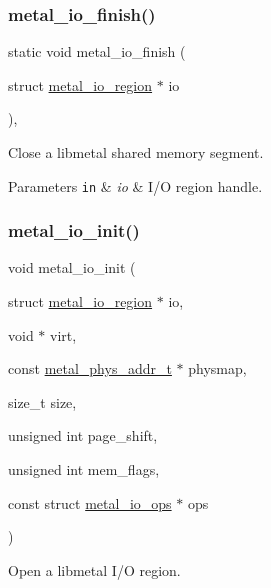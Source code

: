 \subsubsection{\texorpdfstring{metal\+\_\+io\+\_\+finish()}{metal\_io\_finish()}}
{\footnotesize\ttfamily static void metal\+\_\+io\+\_\+finish (\begin{DoxyParamCaption}\item[{struct \hyperlink{structmetal__io__region}{metal\+\_\+io\+\_\+region} $\ast$}]{io }\end{DoxyParamCaption})\hspace{0.3cm}{\ttfamily [inline]}, {\ttfamily [static]}}



Close a libmetal shared memory segment. 


\begin{DoxyParams}[1]{Parameters}
\mbox{\tt in}  & {\em io} & I/O region handle. \\
\hline
\end{DoxyParams}
\mbox{\label{group__io_ga38e0b74d5b2b1f01873a2479494bb89e}} 
\subsubsection{\texorpdfstring{metal\+\_\+io\+\_\+init()}{metal\_io\_init()}}
{\footnotesize\ttfamily void metal\+\_\+io\+\_\+init (\begin{DoxyParamCaption}\item[{struct \hyperlink{structmetal__io__region}{metal\+\_\+io\+\_\+region} $\ast$}]{io,  }\item[{void $\ast$}]{virt,  }\item[{const \hyperlink{group__system_gae024fa10b72199a3e26c29b6eb97df5d}{metal\+\_\+phys\+\_\+addr\+\_\+t} $\ast$}]{physmap,  }\item[{size\+\_\+t}]{size,  }\item[{unsigned int}]{page\+\_\+shift,  }\item[{unsigned int}]{mem\+\_\+flags,  }\item[{const struct \hyperlink{structmetal__io__ops}{metal\+\_\+io\+\_\+ops} $\ast$}]{ops }\end{DoxyParamCaption})}



Open a libmetal I/O region. 


